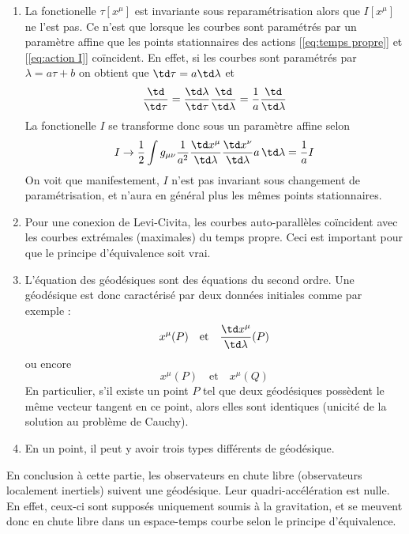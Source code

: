 \begin{enumerate}

    \item La fonctionelle $\tau[x^\mu]$ est invariante sous reparamétrisation alors que $I[x^\mu]$ ne l'est pas. Ce n'est que lorsque les courbes sont paramétrés par un paramètre affine que les points stationnaires des actions [\ref{eq:temps propre}] et [\ref{eq:action I}] coïncident. En effet, si les courbes sont paramétrés par $\lambda = a\tau + b$  on obtient que  $\td\tau = a \td\lambda$ et 
    \begin{equation}
    \frac{\td}{\td\tau} = \frac{\td\lambda}{\td\tau}\frac{\td}{\td\lambda} = \frac{1}{a}\frac{\td}{\td\lambda}
    \end{equation}
    La fonctionelle $I$ se transforme donc sous un paramètre affine selon
    \begin{equation}
        I \to \frac{1}{2}\int g_{\mu \nu}\frac{1}{a^2}\frac{\td x^{\mu}}{\td\lambda}\frac{\td x^{\nu}}{\td\lambda} a \,\td\lambda = \frac{1}{a}I
    \end{equation}
    On voit que manifestement, $I$ n'est pas invariant sous changement de paramétrisation, et n'aura en général plus les mêmes points stationnaires.
    \item Pour une conexion de Levi-Civita, les courbes auto-parallèles coïncident avec les courbes extrémales (maximales) du temps propre. Ceci est important pour que le principe d'équivalence soit vrai.
    \item L'équation des géodésiques sont des équations du second ordre. Une géodésique est donc caractérisé par deux données initiales comme par exemple :
    \begin{equation}
        x^\mu(P) \quad \text{et} \quad \frac{\td x^\mu}{\td \lambda} (P)
    \end{equation}
    ou encore
    \begin{equation}
        x^\mu(P) \quad \text{et} \quad x^\mu(Q)
    \end{equation}
    En particulier, s'il existe un point $P$ tel que deux géodésiques possèdent le même vecteur tangent en ce point, alors elles sont identiques (unicité de la solution au problème de Cauchy). 
    \item En un point, il peut y avoir trois types différents de géodésique.
\end{enumerate}
En conclusion à cette partie, les observateurs en chute libre (observateurs localement inertiels) suivent une géodésique. Leur quadri-accélération est nulle. En effet, ceux-ci sont supposés uniquement soumis à la gravitation, et se meuvent donc en chute libre dans un espace-temps courbe selon le principe d'équivalence.

